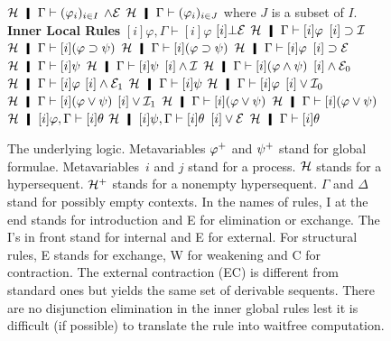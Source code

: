 {\begin{figure}
 \UnaryRule
 {$\hyper\hmid \G\tr(\phi_i)_{i\in I}$}
 {$\wedge\mathcal E$}
 {$\hyper\hmid \G\tr(\phi_i)_{i\in J}$}
 where $J$ is a subset of $I$.
\textbf{Inner Local Rules}
   {$[i]\varphi,\Gamma\vdash [i]\varphi$}
   \hfill
 \UnaryRule{$\hyper\hmid\Gamma\vdash[i]\bot$}
   {$[i]\bot\mathcal E$}
   {$\hyper\hmid\Gamma\vdash[i]\varphi$}
   \vskip 2mm
  \UnaryRule{$\hyper\hmid[i]\varphi,\Gamma\vdash [i]\psi$}
  {$[i]\supset\mathcal I$}
  {$\hyper\hmid\Gamma\vdash [i](\varphi\supset \psi)$}
  \hfill
  \BinaryRule
  {$\hyper\hmid\Gamma\vdash [i](\varphi\supset\psi)$}
  {$\hyper\hmid\Gamma\vdash [i]\varphi$}
  {$[i]\supset\mathcal E$}
  {$\hyper\hmid\Gamma\vdash [i]\psi$}
   \vskip 2mm
  \BinaryRule{$\hyper\hmid\Gamma\vdash [i]\varphi$}
   {$\hyper\hmid\Gamma\vdash [i]\psi$}
   {$[i]\wedge\mathcal I$}
   {$\hyper\hmid\Gamma\vdash [i](\varphi\wedge\psi)$}
   \vskip 2mm
  \UnaryRule{$\hyper\hmid\Gamma\vdash [i](\varphi\wedge\psi)$}
   {$[i]\wedge\mathcal E_0$}
   {$\hyper\hmid\Gamma\vdash[i]\varphi$}
   \hfill
  \UnaryRule{$\hyper\hmid\Gamma\vdash[i](\varphi\wedge\psi)$}
   {$[i]\wedge\mathcal E_1$}
   {$\hyper\hmid\Gamma\vdash[i]\psi$}
\vskip 2mm
  \UnaryRule
   {$\hyper\hmid\Gamma\vdash[i]\varphi$}
   {$[i]\vee\mathcal I_0$}
   {$\hyper\hmid\Gamma\vdash[i](\varphi\vee\psi)$}
   \hfill
  \UnaryRule{$\hyper\hmid\Gamma\vdash[i]\psi$}
   {$[i]\vee\mathcal I_1$}
   {$\hyper\hmid\Gamma\vdash[i](\varphi\vee\psi)$}
\vskip 2mm
   \TrinaryRule
   {$\hyper\hmid\Gamma\vdash[i](\varphi\vee\psi)$}
   {$\hyper\hmid[i]\varphi, \Gamma\vdash[i]\theta$}
   {$\hyper\hmid[i]\psi,    \Gamma\vdash[i]\theta$}
   {$[i]\vee\mathcal E$}
   {$\hyper\hmid         \Gamma\vdash[i]\theta$}
\vskip 2mm
\caption[The underlying logic .]
 {The underlying logic.
 Metavariables ${\varphi}^+$ and ${\psi}^+$ stand for global formulae.
 Metavariables~$i$ and $j$ stand for a process.
 $\mathcal{H}$ stands for a
 hypersequent.
 $\mathcal{H}^+$ stands for a nonempty hypersequent.
 $\Gamma$ and $\Delta$ stand for possibly empty contexts.
 In the names of rules, I at the end stands for introduction and E for
 elimination or exchange.  The I's in front stand for internal and E
 for external.  For structural rules, E stands for exchange, W for
 weakening and C for contraction.  The external contraction (EC) is
 different from standard ones but yields the same set of derivable
 sequents.
 There are no disjunction elimination in the inner global rules lest it
 is difficult (if possible) to translate the rule into
 waitfree computation.
 }
\label{fig:logic}
\end{figure}

}
